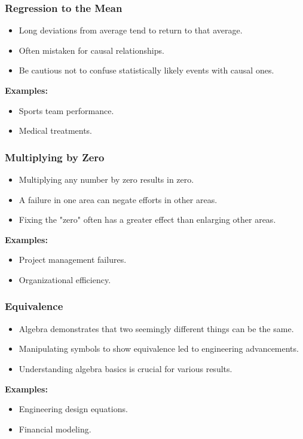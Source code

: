 \begin{frame}[fragile]\frametitle{Regression to the Mean}
\begin{itemize}
    \item Long deviations from average tend to return to that average.
    \item Often mistaken for causal relationships.
    \item Be cautious not to confuse statistically likely events with causal ones.
\end{itemize}
\textbf{Examples:}
\begin{itemize}
    \item Sports team performance.
    \item Medical treatments.
\end{itemize}
\end{frame}

\begin{frame}[fragile]\frametitle{Multiplying by Zero}
\begin{itemize}
    \item Multiplying any number by zero results in zero.
    \item A failure in one area can negate efforts in other areas.
    \item Fixing the "zero" often has a greater effect than enlarging other areas.
\end{itemize}
\textbf{Examples:}
\begin{itemize}
    \item Project management failures.
    \item Organizational efficiency.
\end{itemize}
\end{frame}

\begin{frame}[fragile]\frametitle{Equivalence}
\begin{itemize}
    \item Algebra demonstrates that two seemingly different things can be the same.
    \item Manipulating symbols to show equivalence led to engineering advancements.
    \item Understanding algebra basics is crucial for various results.
\end{itemize}
\textbf{Examples:}
\begin{itemize}
    \item Engineering design equations.
    \item Financial modeling.
\end{itemize}
\end{frame}


